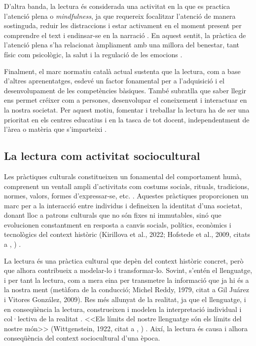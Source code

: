 \documentclass[12pt]{article}
\newcommand{\nestedparencite}[3]{%
  (#1, #2, citat a \citeauthor{#3}, \citeyear{#3})%
}
\newcommand{\nesteddoubleparencite}[5]{%
  (#1, #2; #3, #4, citats a \citeauthor{#5}, \citeyear{#5})%
}
\begin{document}
D'altra banda, la lectura és considerada una activitat en la que es practica l’atenció plena o \emph{mindfulness}, ja que requereix focalitzar l’atenció de manera sostinguda, reduir les distraccions i estar activament en el moment present per comprendre el text i endinsar-se en la narració \parencite{gorsy}. En aquest sentit, la pràctica de l'atenció plena s’ha relacionat àmpliament amb una millora del benestar, tant físic com psicològic, la salut i la regulació de les emocions \parencite{baena}.

Finalment, el marc normatiu català actual sustenta que la lectura, com a base d’altres aprenentatges, esdevé un factor fonamental per a l’adquisició i el desenvolupament de les competències bàsiques. També subratlla que saber llegir ens permet créixer com a persones, desenvolupar el coneixement i interactuar en la nostra societat. Per aquest motiu, fomentar i treballar la lectura ha de ser una prioritat en els centres educatius i en la tasca de tot docent, independentment de l'àrea o matèria que s'imparteixi \parencite{generalitatPLEC}.

\subsection{La lectura com activitat sociocultural}

Les pràctiques culturals constitueixen un fonamental del comportament humà, comprenent un ventall ampli d'activitats com costums socials, rituals, tradicions, normes, valors, formes d'expressar-se, etc. \parencite{shutaleva}. Aquestes pràctiques proporcionen un marc per a la interacció entre individus i defineixen la identitat d'una societat, donant lloc a patrons culturals que no són fixes ni immutables, sinó que evolucionen constantment en resposta a canvis socials, polítics, econòmics i tecnològics del context històric \nesteddoubleparencite{Kirillova et al.}{2022}{Hofstede et al.}{2009}{shutaleva}.

La lectura és una pràctica cultural que depèn del context històric concret, però que alhora contribueix a modelar-lo i transformar-lo. Sovint, s'entén el llenguatge, i per tant la lectura, com a mera eina per transmetre la informació que ja hi és a la nostra ment (metàfora de la conducció; Michel Reddy, 1979, citat a Gil Juárez i Vitores González, 2009). Res més allunyat de la realitat, ja que el llenguatge, i en conseqüència la lectura, construeixen i modelen la interpretació individual i col·lectiva de la realitat \parencite{gil_comu}. <<Els límits del nostre llenguatge són els límits del nostre món>> \nestedparencite{Wittgenstein}{1922}{lanza_wittgenstein}. Així, la lectura és causa i alhora conseqüència del context sociocultural d'una època. 
\end{document}
